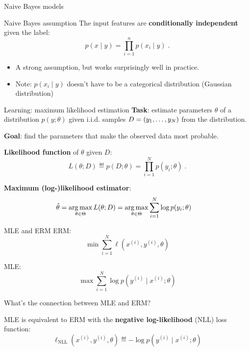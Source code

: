 \documentclass[usenames,dvipsnames,notes,11pt,aspectratio=169]{beamer}
\newcommand{\pdfnote}[1]{}
\begin{document}
\begin{frame}
    {Naive Bayes models}
    \begin{block}
    {Naive Bayes assumption}
        The input features are \textbf{conditionally independent} given the label:
        $$
        p(x\mid y) = \prod_{i=1}^n p(x_i\mid y) \;.
        $$
    \end{block}
    \begin{itemize}
        \item A strong assumption, but works surprisingly well in practice.

        \item Note: $p(x_i\mid y)$ doesn't have to be a categorical distribution (\eg Gaussian distribution)
    \end{itemize}

\end{frame}

\begin{frame}
    {Learning: maximum likelihood estimation}
    \textbf{Task}: estimate parameters $\theta$ of a distribution $p(y; \theta)$ given i.i.d. samples $D=\left( y_1, \ldots, y_N \right)$ from the distribution.

    \textbf{Goal}: find the parameters that make the observed data most probable.

    \pause
    \textbf{Likelihood function} of $\theta$ given $D$:
    $$
    L(\theta; D) \eqdef p(D;\theta) = \prod_{i=1}^N p(y_i; \theta) \;.
    $$

    \textbf{Maximum (log-)likelihood estimator}:
    \begin{align}
        \hat{\theta} &= \operatorname*{arg\,max}_{\theta\in\Theta} L(\theta; D)
        = \operatorname*{arg\,max}_{\theta\in\Theta} \sum_{i=1}^N \log p(y_i; \theta)
    \end{align}

    \pdfnote{To make ``most probable'' more precise, we define the likelihood function of the parameters to be the probability of the data given by the model.}
    \pdfnote{Why can we write the joint distribution as the product? Independent assumption from iid.}
    \pdfnote{Now it's reduced to an optimization problem.}
\end{frame}

\begin{frame}
    {MLE and ERM}
    ERM:
    $$
    \min \sum_{i=1}^N \ell(x^{(i)}, y^{(i)}, \theta)
    $$
    \pause

    MLE:
    $$
    \max \sum_{i=1}^N \log p(y^{(i)} \mid x^{(i)}; \theta)
    $$
    \pause

    What's the connection between MLE and ERM?

    MLE is equivalent to ERM with the \textbf{negative log-likelihood} (NLL) loss function:
    $$
    \ell_{\text{NLL}}(x^{(i)}, y^{(i)}, \theta) \eqdef -\log p(y^{(i)} \mid x^{(i)}; \theta)
    $$
\end{frame}
\end{document}
